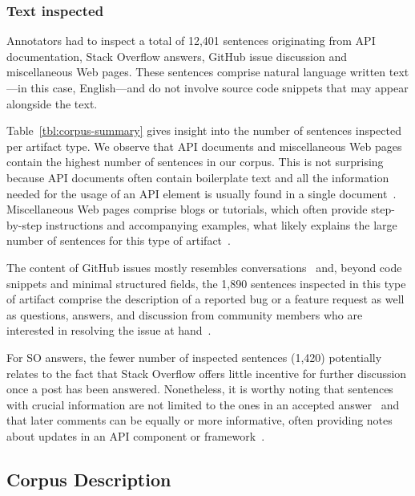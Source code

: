 \subsubsection{Text inspected}





Annotators had to inspect a total of 12,401 sentences originating from API documentation, Stack Overflow answers, GitHub issue discussion and miscellaneous Web pages.
These sentences comprise natural language written text---in this case, English---and do not involve source code snippets that may appear alongside the text.


Table~\ref{tbl:corpus-summary} gives insight into the number of sentences inspected per artifact type. 
We observe that API documents and miscellaneous Web pages contain the highest number of sentences in our corpus.
This is not surprising because API documents often contain boilerplate text 
and all the information needed for the usage of an API element is usually found in a single document~\cite{robillard2011field}.
Miscellaneous Web pages comprise blogs or tutorials, 
which often provide step-by-step instructions and accompanying examples, 
what likely explains the large number of sentences for this type of artifact~\cite{arya2020, Jiang2016b}.


The content of GitHub issues mostly resembles conversations~\cite{Rastkar2010}
and, beyond code snippets and minimal structured fields, the 
1,890 sentences inspected in this type of artifact comprise the description of a reported bug or a feature request as well as questions, answers, and discussion from  community members who are interested in resolving the issue at hand~\cite{zimmermann2010}.



For SO answers, the fewer number of inspected sentences (1,420) potentially relates to 
the fact that Stack Overflow offers little incentive for further discussion once a post has been answered.
Nonetheless, it is worthy noting that sentences with crucial information 
are not limited to the ones in an accepted answer~\cite{nadi2020}
and that later comments can be equally or more informative,
often providing notes about updates in an API component or framework~\cite{zhang2019so}.









\subsection{Corpus Description}
\label{cp4:corpus-description}


